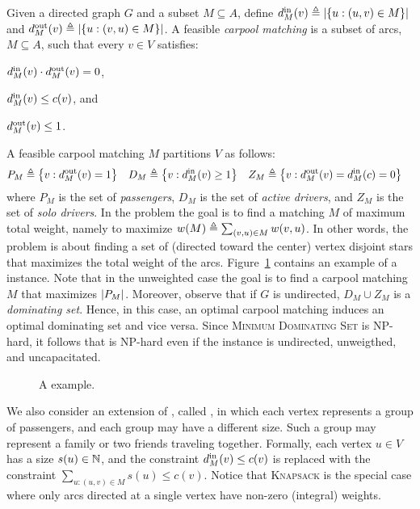 Given a directed graph $G$ and a subset $M \subseteq A$, define
$\din[M](v) \eqdf \abs{\set{u :(u,v) \in M}}$ and
$\dout[M](v) \eqdf \abs{\set{u :(v,u) \in M}}$.
%
A feasible \emph{carpool matching} is a subset of arcs, $M \subseteq
A$, such that every $v \in V$ satisfies:%
\begin{inparaenum}[(i)]
\item $\din[M](v) \cdot \dout[M](v) = 0$,
\item $\din[M](v) \leq c(v)$, and 
\item $\dout[M](v) \leq 1$.
\end{inparaenum}
A feasible carpool matching $M$ partitions $V$ as follows:
\begin{align*}
P_M & \eqdf \set{v : \dout[M](v) = 1} &
D_M & \eqdf \set{v : \din[M](v) \geq 1} &
Z_M & \eqdf \set{v : \dout[M](v) = \din[M](c) = 0}
\end{align*}
where $P_M$ is the set of \emph{passengers}, $D_M$ is the set of
\emph{active drivers}, and $Z_M$ is the set of \emph{solo drivers}.
%
In the \carpool problem the goal is to find a matching $M$ of maximum
total weight, namely to maximize $w(M) \eqdf \sum_{(v,u) \in M}
w(v,u)$.  In other words, the \carpool problem is about finding a set
of (directed toward the center) vertex disjoint stars that maximizes
the total weight of the arcs.  
%
Figure~\ref{fig:carpool} contains an example of a \carpool instance.
%
Note that in the unweighted case the goal is to find a carpool
matching $M$ that maximizes $\abs{P_M}$.
%
Moreover, observe that if $G$ is undirected, $D_M \cup Z_M$ is
a \emph{dominating set}.  Hence, in this case, an optimal carpool
matching induces an optimal dominating set and vice versa.
Since \textsc{Minimum Dominating Set} is NP-hard, it follows
that \carpool is NP-hard even if the instance is undirected,
unweigthed, and uncapacitated.

\begin{figure}
\centering

\caption[]{
\label{fig:carpool}
A \carpool example.
}
\end{figure}  

%
We also consider an extension of \carpool, called \gcp, in which each
vertex represents a group of passengers, and each group may have a
different size.  Such a group may represent a family or two friends
traveling together.  Formally, each vertex $u \in V$ has a size
$s(u) \in \N$, and the constraint $\din[M](v) \leq c(v)$ is replaced
with the constraint $\sum_{u:(u,v) \in M} s(u) \leq c(v)$.
%
Notice that \textsc{Knapsack} is the special case where only arcs
directed at a single vertex have non-zero (integral) weights.

